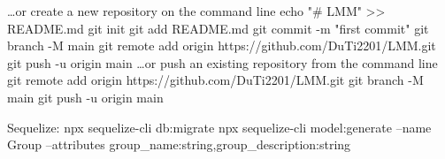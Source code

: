 …or create a new repository on the command line
echo "# LMM" >> README.md
git init
git add README.md
git commit -m "first commit"
git branch -M main
git remote add origin https://github.com/DuTi2201/LMM.git
git push -u origin main
…or push an existing repository from the command line
git remote add origin https://github.com/DuTi2201/LMM.git
git branch -M main
git push -u origin main



Sequelize: npx sequelize-cli db:migrate
npx sequelize-cli model:generate --name Group --attributes group_name:string,group_description:string